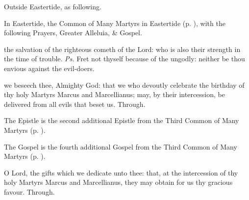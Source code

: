 \begin{rubric}
	Outside Eastertide, as following.
\end{rubric}

\begin{rubric}
	In Eastertide, the Common of Many Martyrs in Eastertide (p. \pageref{CommonMartyrsEaster}), with the following Prayers, Greater Alleluia, \& Gospel.
\end{rubric}

\introit
{} the salvation of the righteous cometh of the Lord: who is also their strength in the time of trouble. \textit{Ps.} Fret not thyself because of the ungodly: neither be thou envious against the evil-doers.

\collect\label{MarcusMarcellianusCollect}
 we beseech thee, Almighty God: that we who devoutly celebrate the birthday of thy holy Martyrs Marcus and Marcellianus; may, by their intercession, be delivered from all evils that beset us. Through.

\begin{rubric}
	The Epistle is the second additional Epistle from the Third Common of Many Martyrs (p. \pageref{Romans51}).
\end{rubric}


\alleluianotice


\begin{rubric}
	The Gospel is the fourth additional Gospel from the Third Common of Many Martyrs (p. \pageref{Luke1147}).
\end{rubric}


\secret\label{MarcusMarcellianusSecret}
 O Lord, the gifts which we dedicate unto thee: that, at the intercession of thy holy Martyrs Marcus and Marcellianus, they may obtain for us thy gracious favour. Through.

